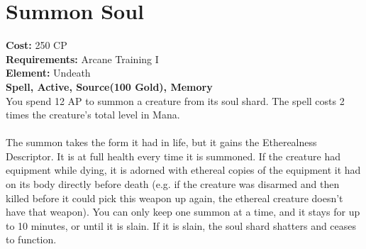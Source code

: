 \section{Summon Soul}
\textbf{Cost:} 250 CP\\
\textbf{Requirements:} Arcane Training I\\
\textbf{Element:} Undeath\\
\textbf{Spell, Active, Source(100 Gold), Memory}\\
You spend 12 AP to summon a creature from its soul shard. The spell costs 2 times the creature’s total level in Mana.\\
\\
The summon takes the form it had in life, but it gains the Etherealness Descriptor. It is at full health every time it is summoned. If the creature had equipment while dying, it is adorned with ethereal copies of the equipment it had on its body directly before death (e.g. if the creature was disarmed and then killed before it could pick this weapon up again, the ethereal creature doesn’t have that weapon). You can only keep one summon at a time, and it stays for up to 10 minutes, or until it is slain. If it is slain, the soul shard shatters and ceases to function.\\